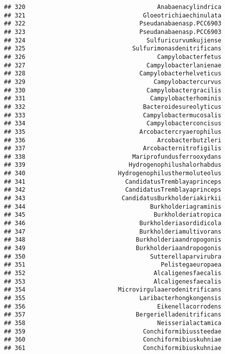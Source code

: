 \documentclass[
]{article}
\begin{document}
\begin{verbatim}
## 320                                     Anabaenacylindrica
## 321                                 Gloeotrichiaechinulata
## 322                                Pseudanabaenasp.PCC6903
## 323                                Pseudanabaenasp.PCC6903
## 324                                  Sulfuricurvumkujiense
## 325                              Sulfurimonasdenitrificans
## 326                                     Campylobacterfetus
## 327                                  Campylobacterlanienae
## 328                                Campylobacterhelveticus
## 329                                    Campylobactercurvus
## 330                                  Campylobactergracilis
## 331                                   Campylobacterhominis
## 332                                 Bacteroidesureolyticus
## 333                                 Campylobactermucosalis
## 334                                  Campylobacterconcisus
## 335                                Arcobactercryaerophilus
## 336                                     Arcobacterbutzleri
## 337                                 Arcobacternitrofigilis
## 338                              Mariprofundusferrooxydans
## 339                             Hydrogenophilushalorhabdus
## 340                          Hydrogenophilusthermoluteolus
## 341                            CandidatusTremblayaprinceps
## 342                            CandidatusTremblayaprinceps
## 343                           CandidatusBurkholderiakirkii
## 344                                   Burkholderiagraminis
## 345                                    Burkholderiatropica
## 346                                Burkholderiasordidicola
## 347                                Burkholderiamultivorans
## 348                               Burkholderiaandropogonis
## 349                               Burkholderiaandropogonis
## 350                                   Sutterellaparvirubra
## 351                                      Pelistegaeuropaea
## 352                                    Alcaligenesfaecalis
## 353                                    Alcaligenesfaecalis
## 354                          Microvirgulaaerodenitrificans
## 355                                Laribacterhongkongensis
## 356                                     Eikenellacorrodens
## 357                               Bergerielladenitrificans
## 358                                     Neisserialactamica
## 359                                 Conchiformibiussteedae
## 360                                 Conchiformibiuskuhniae
## 361                                 Conchiformibiuskuhniae

\end{verbatim}
\end{document}
